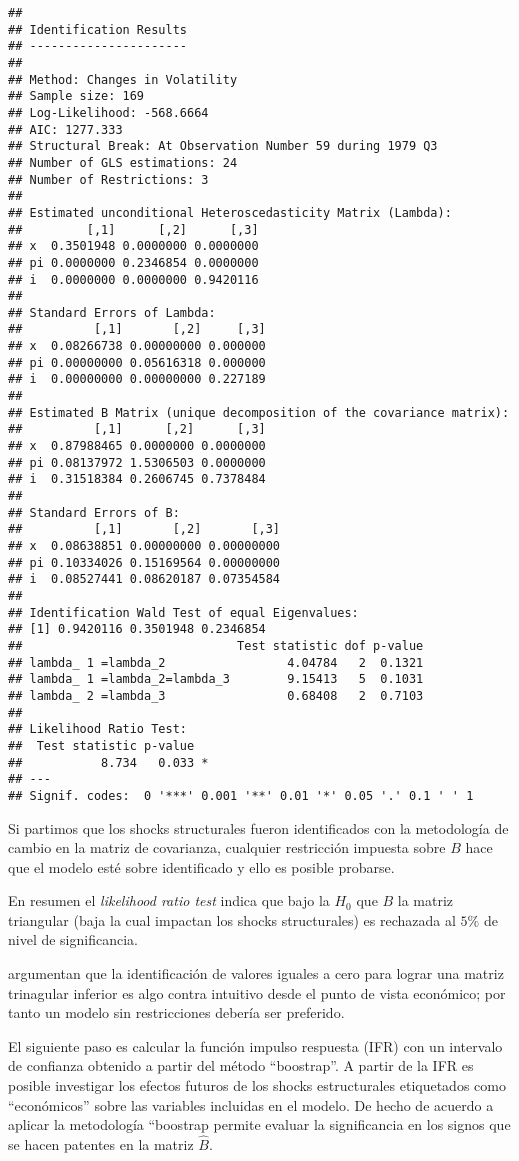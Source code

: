 \documentclass[
]{book}
\begin{document}
\begin{verbatim}
## 
## Identification Results
## ---------------------- 
## 
## Method: Changes in Volatility
## Sample size: 169
## Log-Likelihood: -568.6664
## AIC: 1277.333
## Structural Break: At Observation Number 59 during 1979 Q3
## Number of GLS estimations: 24
## Number of Restrictions: 3
## 
## Estimated unconditional Heteroscedasticity Matrix (Lambda):
##         [,1]      [,2]      [,3]
## x  0.3501948 0.0000000 0.0000000
## pi 0.0000000 0.2346854 0.0000000
## i  0.0000000 0.0000000 0.9420116
## 
## Standard Errors of Lambda:
##          [,1]       [,2]     [,3]
## x  0.08266738 0.00000000 0.000000
## pi 0.00000000 0.05616318 0.000000
## i  0.00000000 0.00000000 0.227189
## 
## Estimated B Matrix (unique decomposition of the covariance matrix): 
##          [,1]      [,2]      [,3]
## x  0.87988465 0.0000000 0.0000000
## pi 0.08137972 1.5306503 0.0000000
## i  0.31518384 0.2606745 0.7378484
## 
## Standard Errors of B:
##          [,1]       [,2]       [,3]
## x  0.08638851 0.00000000 0.00000000
## pi 0.10334026 0.15169564 0.00000000
## i  0.08527441 0.08620187 0.07354584
## 
## Identification Wald Test of equal Eigenvalues:
## [1] 0.9420116 0.3501948 0.2346854
##                              Test statistic dof p-value
## lambda_ 1 =lambda_2                 4.04784   2  0.1321
## lambda_ 1 =lambda_2=lambda_3        9.15413   5  0.1031
## lambda_ 2 =lambda_3                 0.68408   2  0.7103
## 
## Likelihood Ratio Test: 
##  Test statistic p-value  
##           8.734   0.033 *
## ---
## Signif. codes:  0 '***' 0.001 '**' 0.01 '*' 0.05 '.' 0.1 ' ' 1
\end{verbatim}

Si partimos que los shocks structurales fueron identificados con la metodología de cambio en la matriz de covarianza, cualquier restricción impuesta sobre \(B\) hace que el modelo esté sobre identificado y ello es posible probarse.

En resumen el \emph{likelihood ratio test} indica que bajo la \(H_{0}\)
que \(B\) la matriz triangular (baja la cual impactan los shocks structurales) es rechazada al \(5\%\) de nivel de significancia.

\citet{Herwartz2016} argumentan que la identificación de valores iguales a cero para lograr una matriz trinagular inferior es algo contra intuitivo desde el punto de vista económico; por tanto un modelo sin restricciones debería ser preferido.

El siguiente paso es calcular la función impulso respuesta (IFR) con un intervalo de confianza obtenido a partir del método ``boostrap''. A partir de la IFR es posible investigar los efectos futuros de los shocks estructurales etiquetados como ``económicos'' sobre las variables
incluidas en el modelo. De hecho de acuerdo a \citet{Herwartz18} aplicar la metodología ``boostrap permite evaluar la significancia en los signos que se hacen patentes en la matriz \(\hat{B}\).
\end{document}
